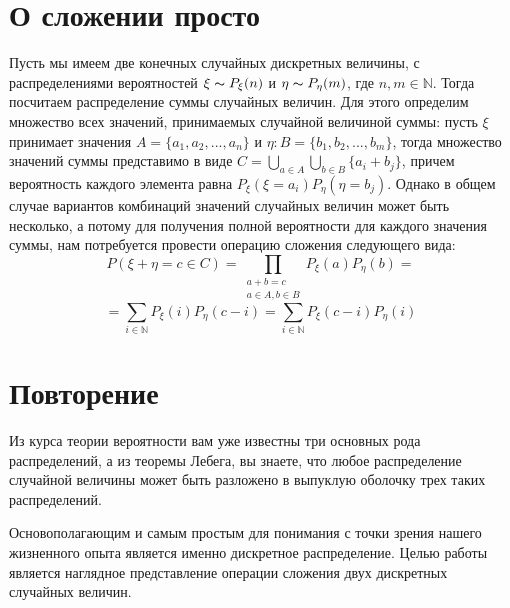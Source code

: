 \documentclass{article}
\begin{document}
\begin{multicols}{2}
    \section{О сложении просто}
    Пусть мы имеем две конечных случайных дискретных величины, с распределениями вероятностей $\xi \thicksim P_\xi(n)$ и $\eta \thicksim P_\eta(m)$, где $n, m \in \mathds{N}$. Тогда посчитаем распределение суммы случайных величин. Для этого определим множество всех значений, принимаемых случайной величиной суммы: пусть $\xi$ принимает значения $A = \{a_1, a_2, ..., a_n\}$ и $\eta: B = \{b_1, b_2, ..., b_m\}$, тогда множество значений суммы представимо в виде $C = \bigcup\limits_{a\in A}\bigcup\limits_{b\in B}{\{a_i + b_j\}}$, причем вероятность каждого элемента равна $P_\xi(\xi = a_i)P_\eta(\eta = b_j)$. Однако в общем случае вариантов комбинаций значений случайных величин может быть несколько, а потому для получения полной вероятности для каждого значения суммы, нам потребуется провести операцию сложения следующего вида:
        $$P(\xi + \eta = c \in C) = \prod_{\substack{a + b = c \\ {a \in A, b \in B}}}{P_\xi(a)P_\eta(b)}=$$
        $$= \sum\limits_{i \in \mathds{N}}{P_\xi(i)P_\eta(c - i)} = 
        \sum\limits_{i \in \mathds{N}}{P_\xi(c - i)P_\eta(i)}$$

    \section{Повторение}
        Из курса теории вероятности вам уже известны три основных рода распределений, а из теоремы Лебега, вы знаете, что любое распределение случайной величины может быть разложено в выпуклую оболочку трех таких распределений. 

        Основополагающим и самым простым для понимания с точки зрения нашего жизненного опыта является именно дискретное распределение. Целью работы является наглядное представление операции сложения двух дискретных случайных величин.
        

\end{multicols}
\end{document}
